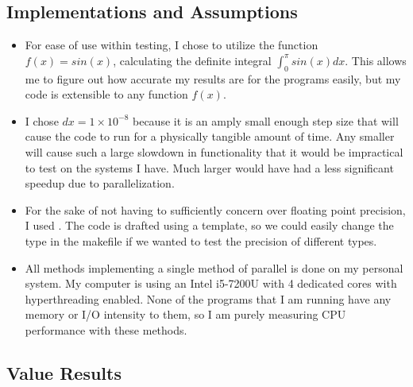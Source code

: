 \documentclass{article}
\begin{document}
\subsection*{Implementations and Assumptions}
\begin{itemize}
	\item For ease of use within testing, I chose to utilize the function $f(x)=sin(x)$, calculating the definite integral $\int_{0}^{\pi}sin(x)dx$. This allows me to figure out how accurate my results are for the programs easily, but my code is extensible to any function $f(x)$.
	\item I chose $dx = 1\times10^{-8}$ because it is an amply small enough step size that will cause the code to run for a physically tangible amount of time. Any smaller will cause such a large slowdown in functionality that it would be impractical to test on the systems I have. Much larger would have had a less significant speedup due to parallelization.
	\item For the sake of not having to sufficiently concern over floating point precision, I used . The code is drafted using a template, so we could easily change the type in the makefile if we wanted to test the precision of different types.
	\item All methods implementing a single method of parallel is done on my personal system. My computer is using an Intel i5-7200U with 4 dedicated cores with hyperthreading enabled. None of the programs that I am running have any memory or I/O intensity to them, so I am purely measuring CPU performance with these methods.
\end{itemize}
\subsection*{Value Results}
\end{document}
